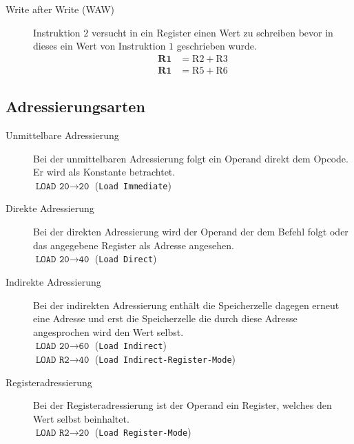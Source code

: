 \documentclass
[
	8pt,		%
	ngerman,	%
	a4paper,	%
	landscape,	%
	final		%
]{extarticle}
\begin{document}
\begin{multicols*}{4}
\begin{description}
	\item[Write after Write (WAW)]
	      Instruktion \(2\) versucht in ein Register einen Wert zu schreiben
	      bevor in dieses ein Wert von Instruktion \(1\) geschrieben wurde.
	      \begin{align}
		      \textbf{R1} & = \text{R2} + \text{R3} \\
		      \textbf{R1} & = \text{R5} + \text{R6}
	      \end{align}
	      \setcounter{equation}{0}
\end{description}
\subsection{Adressierungsarten}
\begin{description}
	\item[Unmittelbare Adressierung]
	      Bei der unmittelbaren Adressierung folgt ein Operand direkt dem
	      Opcode. Er wird als Konstante betrachtet. \\
	      $\texttt{LOAD 20}\rightarrow\texttt{20}$ (\texttt{Load Immediate})

	\item[Direkte Adressierung]
	      Bei der direkten Adressierung wird der Operand der dem Befehl
	      folgt oder das angegebene Register als Adresse angesehen. \\
	      $\texttt{LOAD 20}\rightarrow\texttt{40}$ (\texttt{Load Direct})

	\item[Indirekte Adressierung]
	      Bei der indirekten Adressierung enthält die Speicherzelle dagegen
	      erneut eine Adresse und erst die Speicherzelle die durch diese
	      Adresse angesprochen wird den Wert selbst. \\
	      $\texttt{LOAD 20}\rightarrow\texttt{60}$ (\texttt{Load Indirect})\\
	      $\texttt{LOAD R2}\rightarrow\texttt{40}$ (\texttt{Load Indirect-Register-Mode})

	\item[Registeradressierung]
	      Bei der Registeradressierung ist der Operand ein Register, welches
	      den Wert selbst beinhaltet. \\
	      $\texttt{LOAD R2}\rightarrow\texttt{20}$ (\texttt{Load Register-Mode})


\end{description}
\end{multicols*}
\end{document}
